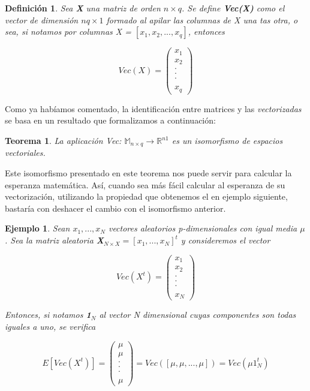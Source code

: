 \documentclass{article}
\theoremstyle{theorem-style}  %
\newtheorem{theorem}{Teorema}[section]  %
\theoremstyle{definition-style}
\newtheorem{definition}{Definición}[section]
\theoremstyle{example-style}
\newtheorem{example}{Ejemplo}[section]
\theoremstyle{exercise-style}
\begin{document}
	\begin{definition}
		Sea \textbf{X} una matriz de orden $n \times q$. Se define \textbf{Vec(X)} como el vector de dimensión $nq \times 1$ formado al apilar las columnas de X una tas otra, o sea, si notamos por columnas \textit{X} = $[x_1, x_2, ..., x_q]$, entonces
		
		$$ Vec(X) = \left({\begin{array}{c}
			x_1\\
			x_2\\
			.\\
			.\\
			.\\
			\\
			x_q
			\end{array} } \right)$$
	\end{definition}
	
	Como ya habíamos comentado, la identificación entre matrices y las \textit{vectorizadas} se basa en un resultado que formalizamos a continuación:
	
	\begin{theorem}
		\textit{La aplicación Vec: $\mathbb{M}_{n \times q} \rightarrow \mathbb{R}^{n1}$ es un isomorfismo de espacios vectoriales.}
	\end{theorem}
	
	
	Este isomorfismo presentado en este teorema nos puede servir para calcular la esperanza matemática. 
	Así, cuando sea más fácil calcular al esperanza de su vectorización, utilizando la propiedad que obtenemos el en ejemplo siguiente, bastaría con deshacer el cambio con el isomorfismo anterior.
	
	
	\begin{example}
		Sean $x_1, ... , x_N$  vectores aleatorios p-dimensionales con igual media $\mu$. Sea la matriz aleatoria \textbf{X}$_{N \times X } = [x_1, ..., x_N]^t$ y consideremos el vector
		
		$$ Vec(X^t) = \left({\begin{array}{c}
			x_1\\
			x_2\\
			.\\
			.\\
			.\\
			\\
			x_N
			\end{array} } \right)$$
		
		Entonces, si notamos \textbf{1}$_N$ al vector N dimensional cuyas componentes son todas iguales a uno, se verifica
		
		$$ E[Vec(X^t)] = \left({\begin{array}{c}
			\mu\\
			\mu\\
			.\\
			.\\
			.\\
			\\
			\mu
			\end{array} } \right) = Vec([\mu, \mu, ..., \mu]) = Vec(\mu 1_N^t)$$
	\end{example}
	
\end{document}
